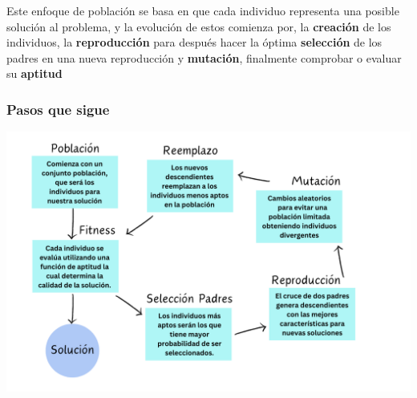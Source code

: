 Este enfoque de población se basa en que cada individuo representa una posible solución 
al problema, y la evolución de estos comienza por, la \textbf{creación} de los individuos, 
la \textbf{reproducción} para después hacer la óptima \textbf{selección} de los padres en 
una nueva reproducción y \textbf{mutación}, finalmente comprobar o evaluar su \textbf{aptitud}\\ 


\subsubsection*{Pasos que sigue}

\begin{center}
    \includegraphics[scale = .4]{IMA/algo genetico.png}
\end{center}